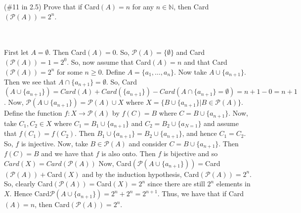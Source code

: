 (\#11 in 2.5) Prove that if Card$(A) = n$ for any $n\in \mathbb{N}$, then
Card$(\mathcal{P}(A))=2^n$.\\\\

\begin{solution}\renewcommand{\qedsymbol}{}\ \\
    First let $A=\emptyset$. Then Card$(A)=0$. So, $\mathcal{P}(A)=\{\emptyset\}$ and
    Card$(\mathcal{P}(A))=1=2^0$. So, now assume that Card$(A)=n$ and that Card$(\mathcal{P}(A))=2^n$
    for some $n\geq0$. Define $A=\{a_1,\ldots, a_n\}$. Now take $A\cup\{a_{n+1}\}$. Then we see that
    $A\cap\{a_{n+1}\}=\emptyset$. So,
    Card$(A\cup\{a_{n+1}\})=Card(A)+Card(\{a_{n+1}\})-Card(A\cap\{a_{n+1}\}=\emptyset)=n+1-0=n+1$. Now,
    $\mathcal{P}(A\cup\{a_{n+1}\})=\mathcal{P}(A)\cup X$ where
    $X=\{B\cup \{a_{n+1}\}|B\in\mathcal{P}(A)\}$. Define the function
    $f:X\rightarrow\mathcal{P}(A)$ by $f(C)=B$ where $C=B\cup \{a_{n+1}\}$. Now, take $C_1,C_2\in X$
    where $C_1=B_1\cup \{a_{n+1}\}$ and $C_2=B_2\cup \{a_{N=1}\}$ and assume that $f(C_1)=f(C_2)$.
    Then $B_1\cup \{a_{n+1}\}=B_2\cup \{a_{n+1}\}$, and hence $C_1=C_2$. So, $f$ is injective. Now,
    take $B\in\mathcal{P}(A)$ and consider $C=B\cup \{a_{n+1}\}$. Then $f(C)=B$ and we have that $f$ is
    also onto. Then $f$ is bijective and so $Card(X)=Card(\mathcal{P}(A))$ Now,
    Card$(\mathcal{P}(A\cup\{a_{n+1}\}))=$Card$(\mathcal{P}(A))+$Card$(X)$ and by the induction
    hypothesis, Card$(\mathcal{P}(A))=2^n$. So, clearly Card$(\mathcal{P}(A))=$Card$(X)=2^n$ since there
    are still $2^n$ elements in $X$. Hence Card$\mathcal{P}(A\cup\{a_{n+1}\})=2^n+2^n=2^{n+1}$. Thus, we
    have that if Card$(A)=n$, then Card$(\mathcal{P}(A))=2^n$.

\end{solution}
